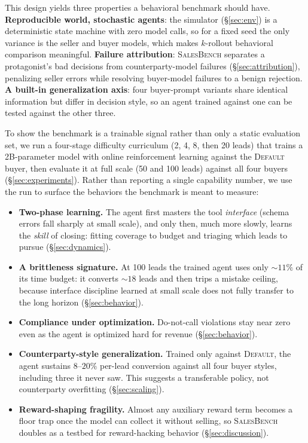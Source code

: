\documentclass{article} %
\newcommand{\salesbench}{\textsc{SalesBench}}
\begin{document}
This design yields three properties a behavioral benchmark should have. \textbf{Reproducible world, stochastic
agents}: the simulator (\S\ref{sec:env}) is a deterministic state machine with zero model calls, so for a fixed seed
the only variance is the seller and buyer models, which makes $k$-rollout behavioral comparison meaningful.
\textbf{Failure attribution}: \salesbench{} separates a protagonist's bad decisions from counterparty-model failures
(\S\ref{sec:attribution}), penalizing seller errors while resolving buyer-model failures to a benign rejection.
\textbf{A built-in generalization axis}: four buyer-prompt variants share identical information but differ in decision
style, so an agent trained against one can be tested against the other three.

To show the benchmark is a trainable signal rather than only a static evaluation set, we run a four-stage
difficulty curriculum (2, 4, 8, then 20 leads) that trains a 2B-parameter model with online
reinforcement learning against the \textsc{Default} buyer, then evaluate it at full scale (50 and 100
leads) against all four buyers (\S\ref{sec:experiments}). Rather than reporting a single capability
number, we use the run to surface the behaviors the benchmark is meant to measure:
\begin{itemize}
\itemsep0.15em
\item \textbf{Two-phase learning.} The agent first masters the tool \emph{interface} (schema errors
fall sharply at small scale), and only then, much more slowly, learns the \emph{skill} of closing:
fitting coverage to budget and triaging which leads to pursue (\S\ref{sec:dynamics}).
\item \textbf{A brittleness signature.} At 100 leads the trained agent uses only ${\sim}11\%$ of its time budget:
it converts ${\sim}18$ leads and then trips a mistake ceiling, because interface discipline learned at small scale
does not fully transfer to the long horizon (\S\ref{sec:behavior}).
\item \textbf{Compliance under optimization.} Do-not-call violations stay near zero even as the agent is optimized
hard for revenue (\S\ref{sec:behavior}).
\item \textbf{Counterparty-style generalization.} Trained only against \textsc{Default}, the agent sustains
$8\text{--}20\%$ per-lead conversion against all four buyer styles, including three it never saw. This suggests a
transferable policy, not counterparty overfitting (\S\ref{sec:scaling}).
\item \textbf{Reward-shaping fragility.} Almost any auxiliary reward term becomes a floor trap once the model can
collect it without selling, so \salesbench{} doubles as a testbed for reward-hacking behavior (\S\ref{sec:discussion}).
\end{itemize}
\end{document}
